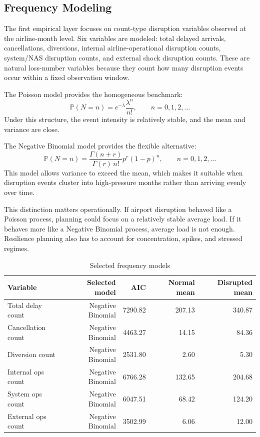 \documentclass[11pt]{article}
\begin{document}
\subsection{Frequency Modeling}
The first empirical layer focuses on count-type disruption variables observed at the airline-month level. Six variables are modeled: total delayed arrivals, cancellations, diversions, internal airline-operational disruption counts, system/NAS disruption counts, and external shock disruption counts. These are natural loss-number variables because they count how many disruption events occur within a fixed observation window.

The Poisson model provides the homogeneous benchmark:
\[
\mathbb{P}(N=n)=e^{-\lambda}\frac{\lambda^n}{n!}, \qquad n=0,1,2,\dots
\]
Under this structure, the event intensity is relatively stable, and the mean and variance are close.

The Negative Binomial model provides the flexible alternative:
\[
\mathbb{P}(N=n)=\frac{\Gamma(n+r)}{\Gamma(r)\,n!}p^r(1-p)^n,
\qquad n=0,1,2,\dots
\]
This model allows variance to exceed the mean, which makes it suitable when disruption events cluster into high-pressure months rather than arriving evenly over time.

This distinction matters operationally. If airport disruption behaved like a Poisson process, planning could focus on a relatively stable average load. If it behaves more like a Negative Binomial process, average load is not enough. Resilience planning also has to account for concentration, spikes, and stressed regimes.

\begin{table}[H]
\centering
\caption{Selected frequency models}
\begin{tabular}{lrrrr}
\toprule
Variable & Selected model & AIC & Normal mean & Disrupted mean \\
\midrule
Total delay count & Negative Binomial & 7290.82 & 207.13 & 340.87 \\
Cancellation count & Negative Binomial & 4463.27 & 14.15 & 84.36 \\
Diversion count & Negative Binomial & 2531.80 & 2.60 & 5.30 \\
Internal ops count & Negative Binomial & 6766.28 & 132.65 & 204.68 \\
System ops count & Negative Binomial & 6047.51 & 68.42 & 124.20 \\
External ops count & Negative Binomial & 3502.99 & 6.06 & 12.00 \\
\bottomrule
\end{tabular}
\end{table}
\end{document}
